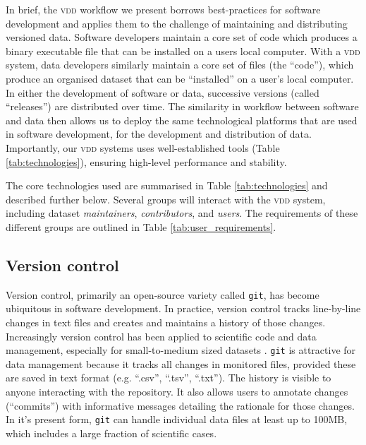 \documentclass[english]{article}
\begin{document}
In brief, the \textsc{vdd} workflow we present borrows best-practices for software development \cite{Perez-Riverol-2016} and applies them to the challenge of maintaining and distributing versioned data. Software developers maintain a core set of code which produces a binary executable file that can be installed on a users local computer. With a \textsc{vdd} system, data developers similarly maintain a core set of files (the ``code''), which produce an organised dataset that can be ``installed'' on a user's local computer. In either the development of software or data, successive versions (called ``releases'') are distributed over time. The similarity in workflow between software and data then allows us to deploy the same technological platforms that are used in software development, for the development and distribution of data. Importantly, our \textsc{vdd} systems uses well-established tools (Table \ref{tab:technologies}), ensuring high-level performance and stability.

The core technologies used are summarised in Table \ref{tab:technologies} and described further below. Several groups will interact with the \textsc{vdd} system, including dataset \emph{maintainers}, \emph{contributors}, and \emph{users}. The requirements of these different groups are outlined in Table \ref{tab:user_requirements}.

\subsection*{Version control}

Version control, primarily an open-source variety called \texttt{git}, has become ubiquitous in software development. In practice, version control tracks line-by-line changes in text files and creates and maintains a history of those changes. Increasingly version control has been applied to scientific code and data management, especially for small-to-medium sized datasets \cite{Ram-2013, Perkel-2016, Lowndes-2017}. \texttt{git} is attractive for data management because it tracks all changes in monitored files, provided these are saved in text format (e.g. ``.csv'', ``.tsv'', ``.txt''). The history is visible to anyone interacting with the repository. It also allows users to annotate changes (``commits'') with informative messages detailing the rationale for those changes. In it's present form, \texttt{git} can handle individual data files at least up to 100MB, which includes a large fraction of scientific cases.
\end{document}
